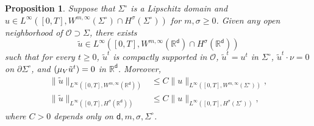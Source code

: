 \documentclass[JEP,XML,SOM,Unicode,published]{cedram}
\newcommand{\Sigmacirc}{\Sigma^\circ}
\theoremstyle{plain}
\newtheorem{prop}[thm]{Proposition}
\theoremstyle{definition}
\let\div\relax
\DeclareMathOperator{\div}{\mathrm{div}}
\newcommand{\R}{{\mathbb{R}}}
\let\p\partial
\let\tl\tilde
\renewcommand{\d}{\mathsf{d}}
\begin{document}
\skpt\begin{prop}\label{lem:VFext}
Suppose that $\Sigmacirc$ is a Lipschitz domain and
$
u \in L^\infty([0,T], W^{m,\infty}(\Sigmacirc)\cap H^\sigma(\Sigmacirc))
$
for $m,\sigma\ge 0$. Given any open neighborhood of $\mathcal{O}\supset \Sigma$, there exists\vspace*{-5pt}
\[
\tl{u}\in L^\infty([0,T], W^{m,\infty}(\R^\d) \cap H^\sigma(\R^\d))
\]
such that for every $t\ge 0$, $\tl{u}^t$ is compactly supported in $\mathcal{O}$, $\tl{u}^t = u^t$ in $\Sigmacirc$, $\tl{u}^t\cdot \nu = 0$ on $\p\Sigmacirc$, and $\div(\mu_V\tl{u}^t) = 0$ in $\R^\d$. Moreover,\vspace*{-5pt}
\begin{align*}
\|\tl{u}\|_{L^\infty([0,T], W^{m,\infty}(\R^\d))} &\le C \|u\|_{L^\infty([0,T], W^{m,\infty}(\Sigmacirc))}, \\
\|\tl{u}\|_{L^\infty([0,T], H^\sigma(\R^\d))} &\le C \|u\|_{L^\infty([0,T], H^\sigma(\Sigmacirc))},
\end{align*}
where $C>0$ depends only on $\d,m,\sigma,\Sigmacirc$.
\end{prop}
\end{document}
